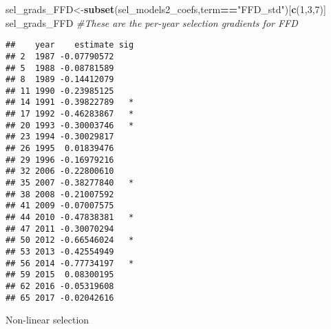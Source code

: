 \documentclass[]{article}
\newenvironment{Shaded}{\begin{snugshade}}{\end{snugshade}}
\newcommand{\KeywordTok}[1]{\textcolor[rgb]{0.13,0.29,0.53}{\textbf{#1}}}
\newcommand{\DecValTok}[1]{\textcolor[rgb]{0.00,0.00,0.81}{#1}}
\newcommand{\StringTok}[1]{\textcolor[rgb]{0.31,0.60,0.02}{#1}}
\newcommand{\CommentTok}[1]{\textcolor[rgb]{0.56,0.35,0.01}{\textit{#1}}}
\newcommand{\OperatorTok}[1]{\textcolor[rgb]{0.81,0.36,0.00}{\textbf{#1}}}
\newcommand{\NormalTok}[1]{#1}
\begin{document}
\begin{Shaded}
\begin{Highlighting}[]
\NormalTok{sel_grads_FFD<-}\KeywordTok{subset}\NormalTok{(sel_models2_coefs,term}\OperatorTok{==}\StringTok{"FFD_std"}\NormalTok{)[}\KeywordTok{c}\NormalTok{(}\DecValTok{1}\NormalTok{,}\DecValTok{3}\NormalTok{,}\DecValTok{7}\NormalTok{)]}
\NormalTok{sel_grads_FFD }\CommentTok{#These are the per-year selection gradients for FFD}
\end{Highlighting}
\end{Shaded}

\begin{verbatim}
##    year    estimate sig
## 2  1987 -0.07790572    
## 5  1988 -0.08781589    
## 8  1989 -0.14412079    
## 11 1990 -0.23985125    
## 14 1991 -0.39822789   *
## 17 1992 -0.46283867   *
## 20 1993 -0.30003746   *
## 23 1994 -0.30029817    
## 26 1995  0.01839476    
## 29 1996 -0.16979216    
## 32 2006 -0.22800610    
## 35 2007 -0.38277840   *
## 38 2008 -0.21007592    
## 41 2009 -0.07007575    
## 44 2010 -0.47838381   *
## 47 2011 -0.30070294    
## 50 2012 -0.66546024   *
## 53 2013 -0.42554949    
## 56 2014 -0.77734197   *
## 59 2015  0.08300195    
## 62 2016 -0.05319608    
## 65 2017 -0.02042616
\end{verbatim}

Non-linear selection
\end{document}
